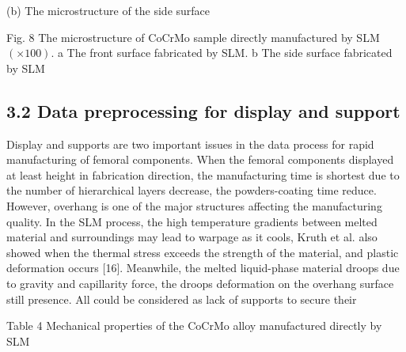 \documentclass[10pt]{article}
\begin{document}
(b) The microstructure of the side surface

Fig. 8 The microstructure of CoCrMo sample directly manufactured by SLM $(\times 100)$. a The front surface fabricated by SLM. b The side surface fabricated by SLM

\subsection*{3.2 Data preprocessing for display and support}
Display and supports are two important issues in the data process for rapid manufacturing of femoral components. When the femoral components displayed at least height in fabrication direction, the manufacturing time is shortest due to the number of hierarchical layers decrease, the powders-coating time reduce. However, overhang is one of the major structures affecting the manufacturing quality. In the SLM process, the high temperature gradients between melted material and surroundings may lead to warpage as it cools, Kruth et al. also showed when the thermal stress exceeds the strength of the material, and plastic deformation occurs [16]. Meanwhile, the melted liquid-phase material droops due to gravity and capillarity force, the droops deformation on the overhang surface still presence. All could be considered as lack of supports to secure their

Table 4 Mechanical properties of the CoCrMo alloy manufactured directly by SLM
\end{document}

